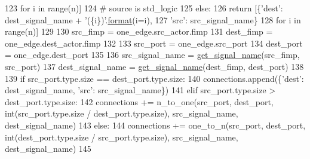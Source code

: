 \begin{DoxyCode}
123                     \textcolor{keywordflow}{for} i \textcolor{keywordflow}{in} range(n)]
124         \textcolor{comment}{# source is std\_logic}
125         \textcolor{keywordflow}{else}:
126             \textcolor{keywordflow}{return} [\{\textcolor{stringliteral}{'dest'}: dest\_signal\_name + \textcolor{stringliteral}{'(\{i\})'}.\hyperlink{namespacesylva_1_1examples_1_1hsdfg_ab3510a0b8457362330aa4d9fd2209590}{format}(i=i),
127                      \textcolor{stringliteral}{'src'}: src\_signal\_name\}
128                     \textcolor{keywordflow}{for} i \textcolor{keywordflow}{in} range(n)]
129 
130     src\_fimp = one\_edge.src\_actor.fimp
131     dest\_fimp = one\_edge.dest\_actor.fimp
132 
133     src\_port = one\_edge.src\_port
134     dest\_port = one\_edge.dest\_port
135 
136     src\_signal\_name = \hyperlink{namespacesylva_1_1code__generation_1_1hsdf__to__vhdl_adfe6fda6b02f34c7fd4f2775ced8228f}{get\_signal\_name}(src\_fimp, src\_port)
137     dest\_signal\_name = \hyperlink{namespacesylva_1_1code__generation_1_1hsdf__to__vhdl_adfe6fda6b02f34c7fd4f2775ced8228f}{get\_signal\_name}(dest\_fimp, dest\_port)
138 
139     \textcolor{keywordflow}{if} src\_port.type.size == dest\_port.type.size:
140         connections.append(\{\textcolor{stringliteral}{'dest'}: dest\_signal\_name, \textcolor{stringliteral}{'src'}: src\_signal\_name\})
141     \textcolor{keywordflow}{elif} src\_port.type.size > dest\_port.type.size:
142         connections += n\_to\_one(src\_port, dest\_port, int(src\_port.type.size / dest\_port.type.size), 
      src\_signal\_name, dest\_signal\_name)
143     \textcolor{keywordflow}{else}:
144         connections += one\_to\_n(src\_port, dest\_port, int(dest\_port.type.size / src\_port.type.size), 
      src\_signal\_name, dest\_signal\_name)
145 
\end{DoxyCode}
\mbox{\label{namespacesylva_1_1code__generation_1_1hsdf__to__vhdl_a34788575516a0c7731b0e5abd4d42231}} 
